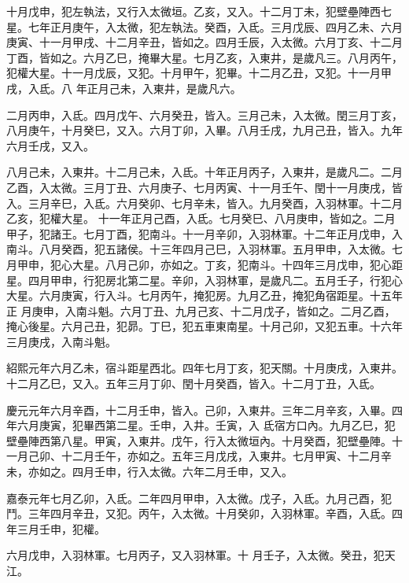 \begin{pinyinscope}
 十月戊申，犯左執法，又行入太微垣。乙亥，又入。十二月丁未，犯壁壘陣西七星。七年正月庚午，入太微，犯左執法。癸酉，入氐。三月戊辰、四月乙未、六月庚寅、十一月甲戌、十二月辛丑，皆如之。四月壬辰，入太微。六月丁亥、十二月丁酉，皆如之。六月乙巳，掩畢大星。七月乙亥，入東井，是歲凡三。八月丙午，犯權大星。十一月戊辰，又犯。十月甲午，犯畢。十二月乙丑，又犯。十一月甲戌，入氐。八
 年正月己未，入東井，是歲凡六。



 二月丙申，入氐。四月戊午、六月癸丑，皆入。三月己未，入太微。閏三月丁亥，八月庚午，十月癸巳，又入。六月丁卯，入畢。八月壬戌，九月己丑，皆入。九年六月壬戌，又入。



 八月己未，入東井。十二月己未，入氐。十年正月丙子，入東井，是歲凡二。二月乙酉，入太微。三月丁丑、六月庚子、七月丙寅、十一月壬午、閏十一月庚戌，皆入。三月辛巳，入氐。六月癸卯、七月辛未，皆入。九月癸酉，入羽林軍。十二月乙亥，犯權大星。
 十一年正月己酉，入氐。七月癸巳、八月庚申，皆如之。二月甲子，犯諸王。七月丁酉，犯南斗。十一月辛卯，入羽林軍。十二年正月戊申，入南斗。八月癸酉，犯五諸侯。十三年四月己巳，入羽林軍。五月甲申，入太微。七月甲申，犯心大星。八月己卯，亦如之。丁亥，犯南斗。十四年三月戊申，犯心距星。四月甲申，行犯房北第二星。辛卯，入羽林軍，是歲凡二。五月壬子，行犯心大星。六月庚寅，行入斗。七月丙午，掩犯房。九月乙丑，掩犯角宿距星。十五年正
 月庚申，入南斗魁。六月丁丑、九月己亥、十二月戊子，皆如之。二月乙酉，掩心後星。六月己丑，犯昴。丁巳，犯五車東南星。十月己卯，又犯五車。十六年三月庚戌，入南斗魁。



 紹熙元年六月乙未，宿斗距星西北。四年七月丁亥，犯天關。十月庚戌，入東井。十二月乙巳，又入。五年三月丁卯、閏十月癸酉，皆入。十二月丁丑，入氐。



 慶元元年六月辛酉，十二月壬申，皆入。己卯，入東井。三年二月辛亥，入畢。四年六月庚寅，犯畢西第二星。壬申，入井。壬寅，入
 氐宿方口內。九月乙巳，犯壁壘陣西第八星。甲寅，入東井。戊午，行入太微垣內。十月癸酉，犯壁壘陣。十一月己卯、十二月壬午，亦如之。五年三月戊戌，入東井。七月甲寅、十二月辛未，亦如之。四月壬申，行入太微。六年二月壬申，又入。



 嘉泰元年七月乙卯，入氐。二年四月甲申，入太微。戊子，入氐。九月己酉，犯鬥。三年四月辛丑，又犯。丙午，入太微。十月癸卯，入羽林軍。辛酉，入氐。四年三月壬申，犯權。



 六月戊申，入羽林軍。七月丙子，又入羽林軍。十
 月壬子，入太微。癸丑，犯天江。




\end{pinyinscope}
